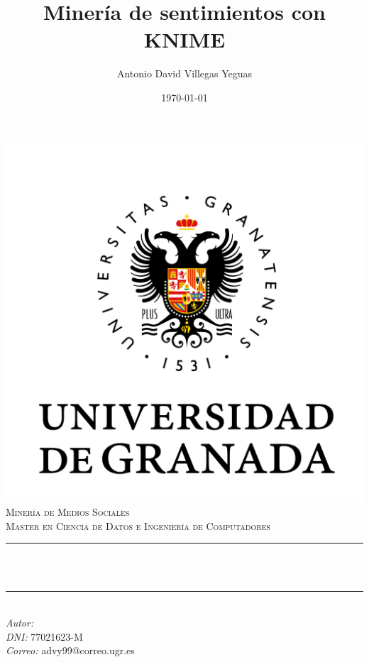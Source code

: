 \documentclass[12pt, spanish]{article}
\title{Minería de sentimientos con KNIME}
\author{Antonio David Villegas Yeguas}
\date{\today}
\makeatletter
\let\thetitle\@title
\let\theauthor\@author
\makeatother
\begin{document}


\begin{titlepage}
    \centering
    \vspace*{-2cm}
    \includegraphics[scale = 0.50]{ugr.png}\\[0.3 cm]
    \textsc{\large Minería de Medios Sociales}\\[0.5 cm]
    \textsc{\large Master en Ciencia de Datos e Ingeniería de Computadores}\\[0 cm]
    \rule{\linewidth}{0.2 mm} \\[0.4cm]
    { \Large \bfseries \thetitle}\\
    \rule{\linewidth}{0.2 mm} \\[1 cm]

     {\large
      \emph{Autor: } \theauthor\\
	   \emph{DNI:   }  77021623-M \\
      \emph{Correo:} advy99@correo.ugr.es}


\end{titlepage}
\end{document}
